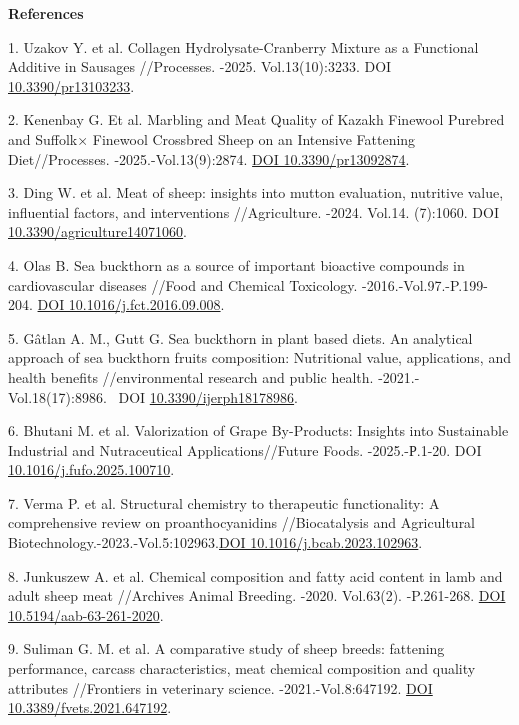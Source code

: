 \begin{center}
{\bfseries References}
\end{center}

\begin{refs}
1. Uzakov Y. et al. Collagen Hydrolysate-Cranberry Mixture as a
Functional Additive in Sausages //Processes. -2025. Vol.13(10):3233. DOI
\href{https://doi.org/10.3390/pr13103233}{10.3390/pr13103233}.

2. Kenenbay G. Et al. Marbling and Meat Quality of Kazakh Finewool
Purebred and Suffolk× Finewool Crossbred Sheep on an Intensive Fattening
Diet//Processes. -2025.-Vol.13(9):2874.
\href{https://doi.org/10.3390/pr13092874}{DOI 10.3390/pr13092874}.

3. Ding W. et al. Meat of sheep: insights into mutton evaluation,
nutritive value, influential factors, and interventions //Agriculture.
-2024. Vol.14. (7):1060. DOI
\href{https://doi.org/10.3390/agriculture14071060}{10.3390/agriculture14071060}.

4. Olas B. Sea buckthorn as a source of important bioactive compounds in
cardiovascular diseases //Food and Chemical Toxicology.
-2016.-Vol.97.-P.199-204.
\href{https://doi.org/10.1016/j.fct.2016.09.008}{DOI
10.1016/j.fct.2016.09.008}.

5. Gâtlan A. M., Gutt G. Sea buckthorn in plant based diets. An
analytical approach of sea buckthorn fruits composition: Nutritional
value, applications, and health benefits //environmental research and
public health. -2021.-Vol.18(17):8986. ~DOI
\href{https://doi.org/10.3390/ijerph18178986}{10.3390/ijerph18178986}.

6. Bhutani M. et al. Valorization of Grape By-Products: Insights into
Sustainable Industrial and Nutraceutical Applications//Future Foods.
-2025.-Р.1-20. DOI
\href{https://doi.org/10.1016/j.fufo.2025.100710}{10.1016/j.fufo.2025.100710}.

7. Verma P. et al. Structural chemistry to therapeutic functionality: A
comprehensive review on proanthocyanidins //Biocatalysis and
Agricultural
Biotechnology.-2023.-Vol.5:102963.\href{https://doi.10.1016/j.bcab.2023.102963}{DOI
10.1016/j.bcab.2023.102963}.

8. Junkuszew A. et al. Chemical composition and fatty acid content in
lamb and adult sheep meat //Archives Animal Breeding. -2020. Vol.63(2).
-P.261-268. \href{https://doi.org/10.5194/aab-63-261-2020}{DOI
10.5194/aab-63-261-2020}.

9. Suliman G. M. et al. A comparative study of sheep breeds: fattening
performance, carcass characteristics, meat chemical composition and
quality attributes //Frontiers in veterinary science.
-2021.-Vol.8:647192.
\href{https://doi.org/10.3389/fvets.2021.647192}{DOI
10.3389/fvets.2021.647192}.


\end{refs}
